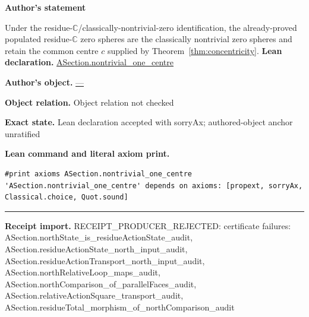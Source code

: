 \documentclass[11pt]{article}
\newcommand{\CC}{\mathbb{C}}
\theoremstyle{plain}
\theoremstyle{definition}
\theoremstyle{remark}
\begin{document}
\medskip
\begin{tcolorbox}[provenancecard,title={48. Corollary - Translation to the classical framework},title after break={48. Corollary - Translation to the classical framework (continued)}]
\textbf{Author's statement}\par
Under the residue-$\CC$/classically-nontrivial-zero identification, the already-proved
populated residue-$\CC$ zero spheres are the classically nontrivial zero spheres and retain the
common centre $c$ supplied by Theorem~\ref{thm:concentricity}.
\tcblower
\textbf{Lean declaration.} \url{ASection.nontrivial_one_centre}
\par\textbf{Author's object.} \url{—}
\par\textbf{Object relation.} Object relation not checked
\par\textbf{Exact state.} Lean declaration accepted with sorryAx; authored-object anchor unratified
\par\smallskip\textbf{Lean command and literal axiom print.}
\begin{Verbatim}[breaklines=true,breakanywhere=true,fontsize=\small]
#print axioms ASection.nontrivial_one_centre
'ASection.nontrivial_one_centre' depends on axioms: [propext, sorryAx, Classical.choice, Quot.sound]
\end{Verbatim}
\medskip\hrule\medskip
\textbf{Receipt import.} \textcolor{KgtRed}{RECEIPT\_PRODUCER\_REJECTED: certificate failures: ASection.northState\_is\_residueActionState\_audit, ASection.residueActionState\_north\_input\_audit, ASection.residueActionTransport\_north\_input\_audit, ASection.northRelativeLoop\_maps\_audit, ASection.northComparison\_of\_parallelFaces\_audit, ASection.relativeActionSquare\_transport\_audit, ASection.residueTotal\_morphism\_of\_northComparison\_audit}
\end{tcolorbox}
\medskip
\end{document}
